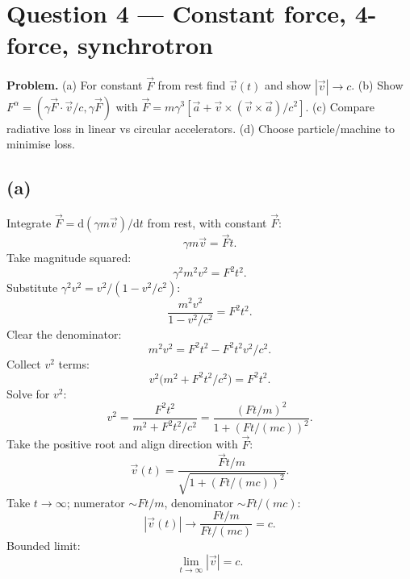 \documentclass[11pt]{article}
\newcommand{\de}{\mathrm{d}}
\begin{document}
\begin{center}
\end{center}

\section*{Question 4 --- Constant force, 4-force, synchrotron}

\textbf{Problem.} (a) For constant $\vec F$ from rest find $\vec v(t)$ and show $|\vec v|\to c$. (b) Show $F^{\alpha}=(\gamma\vec F\cdot\vec v/c,\gamma\vec F)$ with $\vec F=m\gamma^{3}[\vec a+\vec v\times(\vec v\times\vec a)/c^{2}]$. (c) Compare radiative loss in linear vs circular accelerators. (d) Choose particle/machine to minimise loss.

\subsection*{(a)}
Integrate $\vec F=\de(\gamma m\vec v)/\de t$ from rest, with constant $\vec F$:
\[ \gamma m\vec v=\vec F t. \]
Take magnitude squared:
\[ \gamma^{2}m^{2}v^{2}=F^{2}t^{2}. \]
Substitute $\gamma^{2}v^{2}=v^{2}/(1-v^{2}/c^{2})$:
\[ \frac{m^{2}v^{2}}{1-v^{2}/c^{2}}=F^{2}t^{2}. \]
Clear the denominator:
\[ m^{2}v^{2}=F^{2}t^{2}-F^{2}t^{2}v^{2}/c^{2}. \]
Collect $v^{2}$ terms:
\[ v^{2}\big(m^{2}+F^{2}t^{2}/c^{2}\big)=F^{2}t^{2}. \]
Solve for $v^{2}$:
\[ v^{2}=\frac{F^{2}t^{2}}{m^{2}+F^{2}t^{2}/c^{2}}=\frac{(Ft/m)^{2}}{1+(Ft/(mc))^{2}}. \]
Take the positive root and align direction with $\vec F$:
\[ \boxed{\;\vec v(t)=\frac{\vec F t/m}{\sqrt{1+(Ft/(mc))^{2}}}.\;} \]
Take $t\to\infty$; numerator $\sim Ft/m$, denominator $\sim Ft/(mc)$:
\[ |\vec v(t)|\to\frac{Ft/m}{Ft/(mc)}=c. \]
Bounded limit:
\[ \boxed{\;\lim_{t\to\infty}|\vec v|=c.\;} \]
\end{document}
